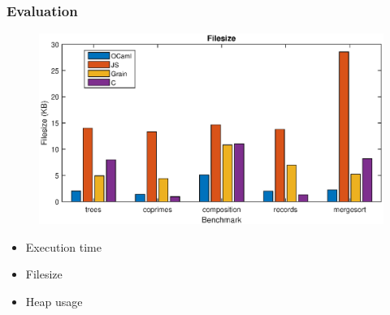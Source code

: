 \documentclass{beamer}
\begin{document}

\begin{frame}\frametitle{Evaluation}
\vspace{-1cm}
\begin{figure}
    \hspace*{-0.3in}
    \includegraphics[scale=0.6]{filesize2}
\end{figure}
\vspace{-0.5cm}
\begin{itemize}
\item Execution time
\item Filesize
\item Heap usage
\end{itemize}
\end{frame}
\end{document}
